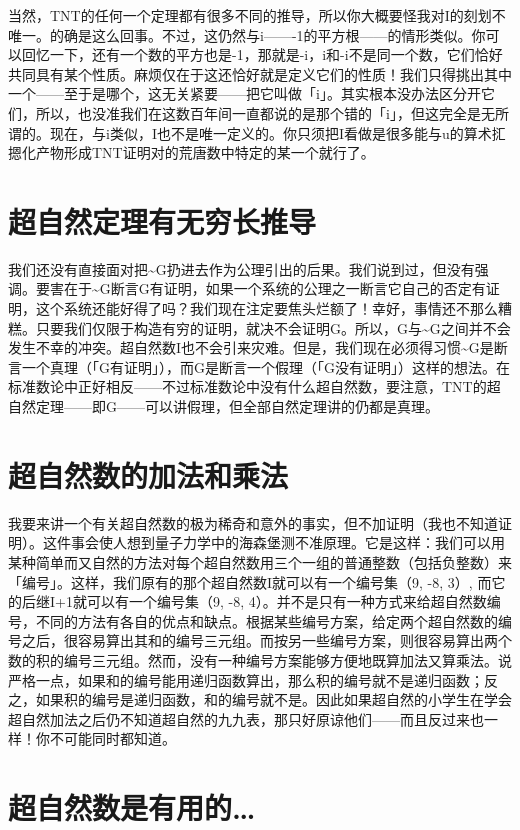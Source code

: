 \documentclass[
  12pt,
  twoside,
  openright,
  oldfontcommands,
]{memoir}
\begin{document}
当然，TNT的任何一个定理都有很多不同的推导，所以你大概要怪我对I的刻划不唯一。的确是这么回事。不过，这仍然与i-------1的平方根------的情形类似。你可以回忆一下，还有一个数的平方也是-1，那就是-i，i和-i不是同一个数，它们恰好共同具有某个性质。麻烦仅在于这还恰好就是定义它们的性质！我们只得挑出其中一个------至于是哪个，这无关紧要------把它叫做「i」。其实根本没办法区分开它们，所以，也没准我们在这数百年间一直都说的是那个错的「i」，但这完全是无所谓的。现在，与i类似，I也不是唯一定义的。你只须把I看做是很多能与u的算术㧟摁化产物形成TNT证明对的荒唐数中特定的某一个就行了。

\section{超自然定理有无穷长推导}

我们还没有直接面对把\textasciitilde G扔进去作为公理引出的后果。我们说到过，但没有强调。要害在于\textasciitilde G断言G有证明，如果一个系统的公理之一断言它自己的否定有证明，这个系统还能好得了吗？我们现在注定要焦头烂额了！幸好，事情还不那么糟糕。只要我们仅限于构造有穷的证明，就决不会证明G。所以，G与\textasciitilde G之间并不会发生不幸的冲突。超自然数I也不会引来灾难。但是，我们现在必须得习惯\textasciitilde G是断言一个真理（「G有证明」），而G是断言一个假理（「G没有证明」）这样的想法。在标准数论中正好相反------不过标准数论中没有什么超自然数，要注意，TNT的超自然定理------即G------可以讲假理，但全部自然定理讲的仍都是真理。

\section{超自然数的加法和乘法}

我要来讲一个有关超自然数的极为稀奇和意外的事实，但不加证明（我也不知道证明）。这件事会使人想到量子力学中的海森堡测不准原理。它是这样：我们可以用某种简单而又自然的方法对每个超自然数用三个一组的普通整数（包括负整数）来「编号」。这样，我们原有的那个超自然数I就可以有一个编号集（9,
-8, 3）, 而它的后继I+1就可以有一个编号集（9, -8,
4）。并不是只有一种方式来给超自然数编号，不同的方法有各自的优点和缺点。根据某些编号方案，给定两个超自然数的编号之后，很容易算出其和的编号三元组。而按另一些编号方案，则很容易算出两个数的积的编号三元组。然而，没有一种编号方案能够方便地既算加法又算乘法。说严格一点，如果和的编号能用递归函数算出，那么积的编号就不是递归函数；反之，如果积的编号是递归函数，和的编号就不是。因此如果超自然的小学生在学会超自然加法之后仍不知道超自然的九九表，那只好原谅他们------而且反过来也一样！你不可能同时都知道。

\section{超自然数是有用的\ldots{}}
\end{document}

